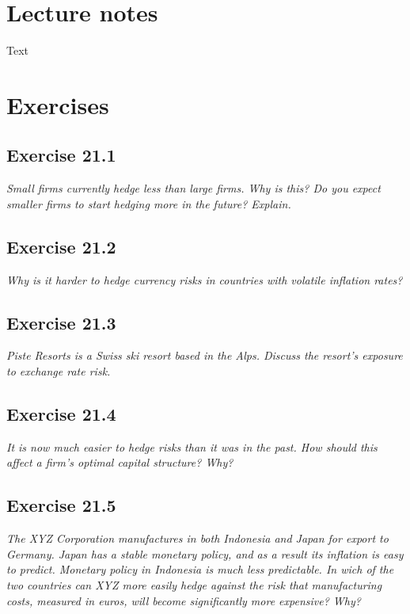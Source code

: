 \documentclass[]{book}
\theoremstyle{definition}
\theoremstyle{definition}
\theoremstyle{remark}
\begin{document}
\section{Lecture notes}\label{lecture-notes-21}

Text

\section{Exercises}\label{exercises-21}

\subsection{Exercise 21.1}\label{exercise-21.1}

\emph{Small firms currently hedge less than large firms. Why is this? Do
you expect smaller firms to start hedging more in the future? Explain.}
\citep[p.712]{book}

\subsection{Exercise 21.2}\label{exercise-21.2}

\emph{Why is it harder to hedge currency risks in countries with
volatile inflation rates?} \citep[p.712]{book}

\subsection{Exercise 21.3}\label{exercise-21.3}

\emph{Piste Resorts is a Swiss ski resort based in the Alps. Discuss the
resort's exposure to exchange rate risk.} \citep[p.712]{book}

\subsection{Exercise 21.4}\label{exercise-21.4}

\emph{It is now much easier to hedge risks than it was in the past. How
should this affect a firm's optimal capital structure? Why?}
\citep[p.712]{book}

\subsection{Exercise 21.5}\label{exercise-21.5}

\emph{The XYZ Corporation manufactures in both Indonesia and Japan for
export to Germany. Japan has a stable monetary policy, and as a result
its inflation is easy to predict. Monetary policy in Indonesia is much
less predictable. In wich of the two countries can XYZ more easily hedge
against the risk that manufacturing costs, measured in euros, will
become significantly more expensive? Why?} \citep[p.712]{book}
\end{document}
